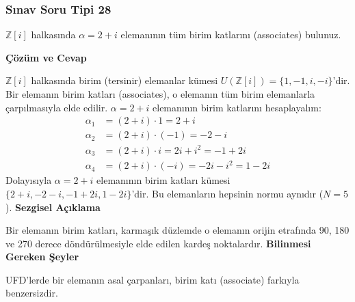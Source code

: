 \documentclass[11pt, a4paper]{article}
\newenvironment{cozum}{
    \vspace{0.5cm}
    \noindent\textcolor{green!60!black}{\faCheckCircle\enspace \textbf{\Large Çözüm ve Cevap}}\par\vspace{0.2cm}
}{}
\newenvironment{sezgisel}{
    \vspace{0.5cm}
    \noindent\textcolor{orange!80!black}{\faLightbulb\enspace \textbf{\Large Sezgisel Açıklama}}\par\vspace{0.2cm}
    \itshape
}{}
\newenvironment{bilgi}{
    \vspace{0.5cm}
    \noindent\textcolor{red!70!black}{\faExclamationTriangle\enspace \textbf{\Large Bilinmesi Gereken Şeyler}}\par\vspace{0.2cm}
}{}
\begin{document}
\subsubsection{Sınav Soru Tipi 28}
\begin{sinavbox}
$\mathbb{Z}[i]$ halkasında $\alpha = 2+i$ elemanının tüm birim katlarını (associates) bulunuz.
\end{sinavbox}
\begin{cozum}
$\mathbb{Z}[i]$ halkasında birim (tersinir) elemanlar kümesi $U(\mathbb{Z}[i]) = \{1, -1, i, -i\}$'dir.
Bir elemanın birim katları (associates), o elemanın tüm birim elemanlarla çarpılmasıyla elde edilir.
$\alpha = 2+i$ elemanının birim katlarını hesaplayalım:
\begin{align*}
\alpha_1 &= (2+i) \cdot 1 = 2+i \\
\alpha_2 &= (2+i) \cdot (-1) = -2-i \\
\alpha_3 &= (2+i) \cdot i = 2i + i^2 = -1 + 2i \\
\alpha_4 &= (2+i) \cdot (-i) = -2i - i^2 = 1 - 2i
\end{align*}
Dolayısıyla $\alpha = 2+i$ elemanının birim katları kümesi $\{2+i, -2-i, -1+2i, 1-2i\}$'dir. Bu elemanların hepsinin normu aynıdır ($N = 5$).
\end{cozum}
\begin{sezgisel}
Bir elemanın birim katları, karmaşık düzlemde o elemanın orijin etrafında 90, 180 ve 270 derece döndürülmesiyle elde edilen kardeş noktalardır.
\end{sezgisel}
\begin{bilgi}
UFD'lerde bir elemanın asal çarpanları, birim katı (associate) farkıyla benzersizdir.
\end{bilgi}

\newpage
\end{document}
